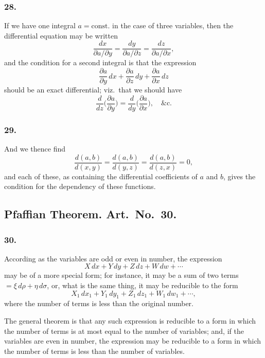 \documentclass[11pt,a4paper]{book}
\begin{document}
\newpage
\setcounter{page}{124}

\subsubsection*{28.}

If we have one integral $a = \text{const.}$ in the case of three variables, then the differential equation may be written
\[
\frac{dx}{\partial a/\partial y} = \frac{dy}{\partial a/\partial z} = \frac{dz}{\partial a/\partial x},
\]
and the condition for a second integral is that the expression
\[
\frac{\partial a}{\partial y}\,dx + \frac{\partial a}{\partial z}\,dy + \frac{\partial a}{\partial x}\,dz
\]
should be an exact differential; viz.~that we should have
\[
\frac{d}{dz}\biggl(\frac{\partial a}{\partial y}\biggr) = \frac{d}{dy}\biggl(\frac{\partial a}{\partial x}\biggr), \quad \&\text{c.}
\]

\subsubsection*{29.}

And we thence find
\[
\frac{d(a, b)}{d(x, y)} = \frac{d(a, b)}{d(y, z)} = \frac{d(a, b)}{d(z, x)} = 0,
\]
and each of these, as containing the differential coefficients of $a$ and $b$, gives the condition for the dependency of these functions.

\subsection*{Pfaffian Theorem. Art.~No.~30.}

\subsubsection*{30.}

According as the variables are odd or even in number, the expression
\[
X\,dx + Y\,dy + Z\,dz + W\,dw + \cdots
\]
may be of a more special form; for instance, it may be a sum of two terms $= \xi\,d\rho + \eta\,d\sigma$, or, what is the same thing, it may be reducible to the form
\[
X_{1}\,dx_{1} + Y_{1}\,dy_{1} + Z_{1}\,dz_{1} + W_{1}\,dw_{1} + \cdots,
\]
where the number of terms is less than the original number.

\newpage
\setcounter{page}{125}

The general theorem is that any such expression is reducible to a form in which the number of terms is at most equal to the number of variables; and, if the variables are even in number, the expression may be reducible to a form in which the number of terms is less than the number of variables.
\end{document}
